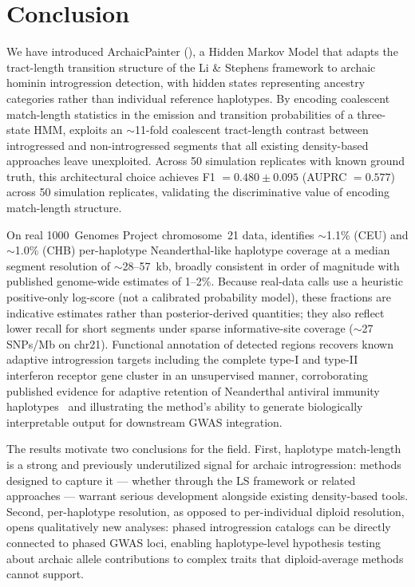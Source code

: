 \section*{Conclusion}

We have introduced ArchaicPainter (\AP{}), a Hidden Markov Model that adapts the
tract-length transition structure of the Li \& Stephens framework to archaic hominin
introgression detection, with hidden states representing ancestry categories rather
than individual reference haplotypes.
By encoding coalescent match-length statistics in the emission and transition
probabilities of a three-state HMM, \AP{} exploits an $\sim$11-fold
coalescent tract-length contrast between introgressed and non-introgressed segments
that all existing density-based approaches leave unexploited.
Across 50 simulation replicates with known ground truth, this architectural
choice achieves F1 $= 0.480 \pm 0.095$ (AUPRC $= 0.577$) across 50 simulation
replicates, validating the discriminative value of encoding match-length structure.

On real 1000~Genomes Project chromosome~21 data, \AP{} identifies
$\sim$1.1\% (CEU) and $\sim$1.0\% (CHB) per-haplotype Neanderthal-like
haplotype coverage at a median segment resolution of $\sim$28--57~kb,
broadly consistent in order of magnitude with published genome-wide estimates of 1--2\%.
Because real-data calls use a heuristic positive-only log-score (not a calibrated
probability model), these fractions are indicative estimates rather than
posterior-derived quantities; they also reflect lower recall for short segments
under sparse informative-site coverage ($\sim$27 SNPs/Mb on chr21).
Functional annotation of detected regions recovers known adaptive introgression
targets including the complete type-I and type-II interferon receptor gene cluster
in an unsupervised manner, corroborating published evidence for adaptive retention
of Neanderthal antiviral immunity haplotypes~\citep{dannemann2017contribution,
enard2018human} and illustrating the method's ability
to generate biologically interpretable output for downstream GWAS integration.

The results motivate two conclusions for the field.
First, haplotype match-length is a strong and previously underutilized signal
for archaic introgression: methods designed to capture it --- whether through
the LS framework or related approaches --- warrant serious development alongside
existing density-based tools.
Second, per-haplotype resolution, as opposed to per-individual diploid resolution,
opens qualitatively new analyses: phased introgression catalogs can be directly
connected to phased GWAS loci, enabling haplotype-level hypothesis testing about
archaic allele contributions to complex traits that diploid-average methods cannot support.

